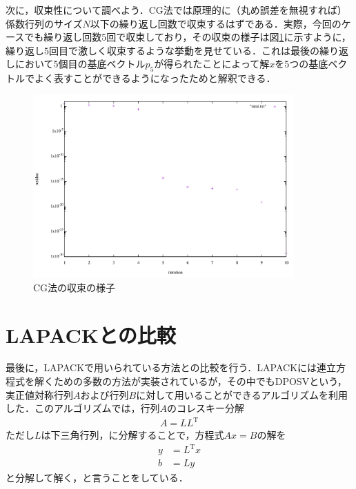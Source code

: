 \documentclass[a4j]{jarticle}
\begin{document}
次に，収束性について調べよう．CG法では原理的に（丸め誤差を無視すれば）係数行列のサイズ$N$以下の繰り返し回数で収束するはずである．実際，今回のケースでも繰り返し回数$5$回で収束しており，その収束の様子は図\ref{020034_28Jul19}に示すように，繰り返し$5$回目で激しく収束するような挙動を見せている．これは最後の繰り返しにおいて$5$個目の基底ベクトル$p_5$が得られたことによって解$x$を$5$つの基底ベクトルでよく表すことができるようになったためと解釈できる．
\begin{figure}[htb]
 \centering
\includegraphics[bb=6 12 829 574,width=10cm]{tatai.pdf}
\caption{CG法の収束の様子}
\label{020034_28Jul19}
\end{figure}





\section{LAPACKとの比較}
最後に，LAPACKで用いられている方法との比較を行う．LAPACKには連立方程式を解くための多数の方法が実装されているが，その中でもDPOSVという，実正値対称行列$A$および行列$B$に対して用いることができるアルゴリズムを利用した．このアルゴリズムでは，行列$A$のコレスキー分解
\begin{align*}
 A=LL^{\mathrm{T}}
\end{align*}
ただし$L$は下三角行列，に分解することで，方程式$Ax=B$の解を
\begin{align*}
 y&=L^{\mathrm{T}}x \\
 b&=Ly
\end{align*}
と分解して解く，と言うことをしている．
\end{document}
